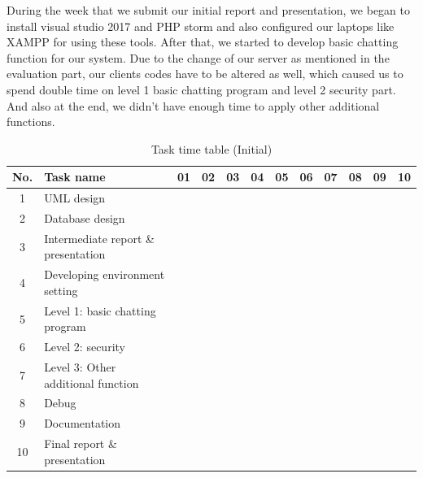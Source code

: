 \documentclass[a4paper,11pt]{article}
\begin{document}
During the week that we submit our initial report and presentation, we began to install visual studio 2017 and PHP storm and also configured our laptops like XAMPP for using these tools. After that, we started to develop basic chatting function for our system. Due to the change of our server as mentioned in the evaluation part, our clients codes have to be altered as well, which caused us to spend double time on level 1 basic chatting program and level 2 security part. And also at the end, we didn't have enough time to apply other additional functions.    

\begin{table}[h]
\centering
\caption{Task time table (Initial)}
\label{my-label}
\begin{tabular}{|c|l||c|c|c|c|c|c|c|c|c|c|}
\hline
\rowcolor{No}
No. & Task name & 01 & 02 & 03 & 04 & 05 & 06 & 07 & 08 & 09 & 10 \\ \hline \hline
1 & UML design & \cellcolor{UML} & \cellcolor{UML} &  &  &  &  &  &  &  &  \\ \hline
2 & Database design & \cellcolor{Data} & \cellcolor{Data} &  &  &  &  &  &  &  &  \\ \hline
3 & Intermediate report \& presentation &  & \cellcolor{intermediate} & \cellcolor{intermediate} &  &  &  &  &  &  &  \\ \hline
4 & Developing environment setting &  &  & \cellcolor{environ} & \cellcolor{environ} &  &  &  &  &  &  \\ \hline
5 & Level 1: basic chatting program &  &  & \cellcolor{level1} & \cellcolor{level1} & \cellcolor{level1} &  &  &  &  &  \\ \hline
6 & Level 2: security &  &  &  &  & \cellcolor{level2} & \cellcolor{level2} & \cellcolor{level2} &  &  &  \\ \hline
7 & Level 3: Other additional function &  &  &  &  &  &  & \cellcolor{level3} & \cellcolor{level3} & \cellcolor{level3} &  \\ \hline
8 & Debug &  &  &  &  & \cellcolor{debug} & \cellcolor{debug} & \cellcolor{debug} & \cellcolor{debug} & \cellcolor{debug} & \cellcolor{debug} \\ \hline
9 & Documentation &  &  &  &  & \cellcolor{documentation} &  & \cellcolor{documentation} &  & \cellcolor{documentation} &  \\ \hline
10 & Final report \& presentation &  &  &  &  &  &  &  &  & \cellcolor{final} & \cellcolor{final} \\ \hline
\end{tabular}
\end{table}
\end{document}
